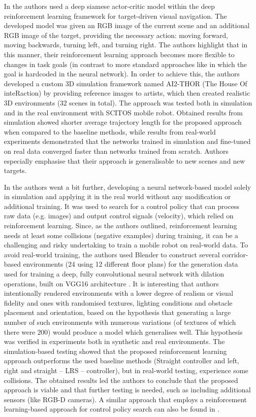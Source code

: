 In \cite{Zhu2017} the authors used a deep siamese actor-critic model within the deep reinforcement learning framework for target-driven visual navigation. The developed model was given an RGB image of the current scene and an additional RGB image of the target, providing the necessary action: moving forward, moving backwards, turning left, and turning right. The authors highlight that in this manner, their reinforcement learning approach becomes more flexible to changes in task goals (in contrast to more standard approaches like  \cite{Mnih2015} in which the goal is hardcoded in the neural network). In order to achieve this, the authors developed a custom 3D simulation framework named AI2-THOR (The House Of inteRaction) by providing reference images to artists, which then created realistic 3D environments (32 scenes in total). The approach was tested both in simulation and in the real environment with SCITOS mobile robot. Obtained results from simulation showed shorter average trajectory length for the proposed approach when compared to the baseline methods, while results from real-world experiments demonstrated that the networks trained in simulation and fine-tuned on real data converged faster than networks trained from scratch. Authors especially emphasise that their approach is generalisable to new scenes and new targets.

In \cite{Sadeghi2016} the authors went a bit further, developing a neural network-based model solely in simulation and applying it in the real world without any modification or additional training. It was used to search for a control policy that can process raw data (e.g. images) and output control signals (velocity), which relied on reinforcement learning. Since, as the authors outlined, reinforcement learning needs at least some collisions (negative examples) during training, it can be a challenging and risky undertaking to train a mobile robot on real-world data. To avoid real-world training, the authors used Blender \cite{Blender2018} to construct several corridor-based environments (24 using 12 different floor plans) for the generation data used for training a deep, fully convolutional neural network with dilation operations, built on VGG16 architecture \cite{Simonyan2014}. It is interesting that authors intentionally rendered environments with a lower degree of realism or visual fidelity and ones with randomised textures, lighting conditions and obstacle placement and orientation, based on the hypothesis that generating a large number of such environments with numerous variations (of textures of which there were 200) would produce a model which generalises well. This hypothesis was verified in experiments both in synthetic and real environments. The simulation-based testing showed that the proposed reinforcement learning approach outperforms the used baseline methods (Straight controller and left, right and straight -- LRS -- controller), but in real-world testing, experience some collisions. The obtained results led the authors to conclude that the proposed approach is viable and that further testing is needed, such as including additional sensors (like RGB-D cameras). A similar approach that employs a reinforcement learning-based approach for control policy search can also be found in \cite{Zhang2015}.

